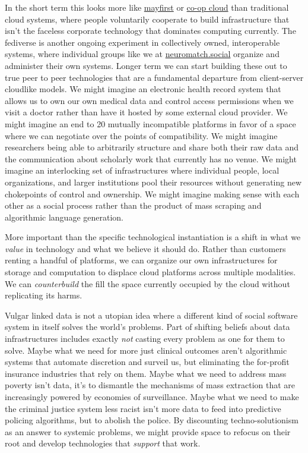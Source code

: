 In the short term this looks more like
\href{https://mayfirst.coop/en/}{mayfirst} or
\href{https://coopcloud.tech/}{co-op cloud} than traditional cloud
systems, where people voluntarily cooperate to build infrastructure that
isn't the faceless corporate technology that dominates computing
currently. The fediverse is another ongoing experiment in collectively
owned, interoperable systems, where individual groups like we at
\href{https://neuromatch.social}{neuromatch.social} organize and
administer their own systems. Longer term we can start building these
out to true peer to peer technologies that are a fundamental departure
from client-server cloudlike models. We might imagine an electronic
health record system that allows us to own our own medical data and
control access permissions when we visit a doctor rather than have it
hosted by some external cloud provider. We might imagine an end to 20
mutually incompatible platforms in favor of a space where we can
negotiate over the points of compatibility. We might imagine researchers
being able to arbitrarily structure and share both their raw data and
the communication about scholarly work that currently has no venue. We
might imagine an interlocking set of infrastructures where individual
people, local organizations, and larger institutions pool their
resources without generating new chokepoints of control and ownership.
We might imagine making sense with each other as a social process rather
than the product of mass scraping and algorithmic language generation.

More important than the specific technological instantiation is a shift
in what we \emph{value} in technology and what we believe it should do.
Rather than customers renting a handful of platforms, we can organize
our own infrastructures for storage and computation to displace cloud
platforms across multiple modalities. We can \emph{counterbuild} the
fill the space currently occupied by the cloud without replicating its
harms.

Vulgar linked data is not a utopian idea where a different kind of
social software system in itself solves the world's problems. Part of
shifting beliefs about data infrastructures includes exactly \emph{not}
casting every problem as one for them to solve. Maybe what we need for
more just clinical outcomes aren't algorithmic systems that automate
discretion and surveil us, but eliminating the for-profit insurance
industries that rely on them. Maybe what we need to address mass poverty
isn't data, it's to dismantle the mechanisms of mass extraction that are
increasingly powered by economies of surveillance. Maybe what we need to
make the criminal justice system less racist isn't more data to feed
into predictive policing algorithms, but to abolish the police. By
discounting techno-solutionism as an answer to systemic problems, we
might provide space to refocus on their root and develop technologies
that \emph{support} that work.

